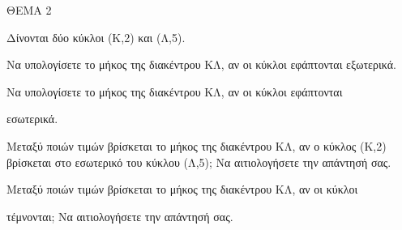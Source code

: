 
ΘΕΜΑ 2

Δίνονται δύο κύκλοι (Κ,2) και (Λ,5).

\begin{alist}
\item Να υπολογίσετε το μήκος της διακέντρου ΚΛ, αν οι κύκλοι εφάπτονται εξωτερικά.


\item Να υπολογίσετε το μήκος της διακέντρου ΚΛ, αν οι κύκλοι εφάπτονται

εσωτερικά. 

\item Μεταξύ ποιών τιμών βρίσκεται το μήκος της διακέντρου ΚΛ, αν ο κύκλος (Κ,2) βρίσκεται στο εσωτερικό του κύκλου (Λ,5); Να αιτιολογήσετε την απάντησή σας.


\item Μεταξύ ποιών τιμών βρίσκεται το μήκος της διακέντρου ΚΛ, αν οι κύκλοι

τέμνονται; Να αιτιολογήσετε την απάντησή σας. 
\end{alist}
